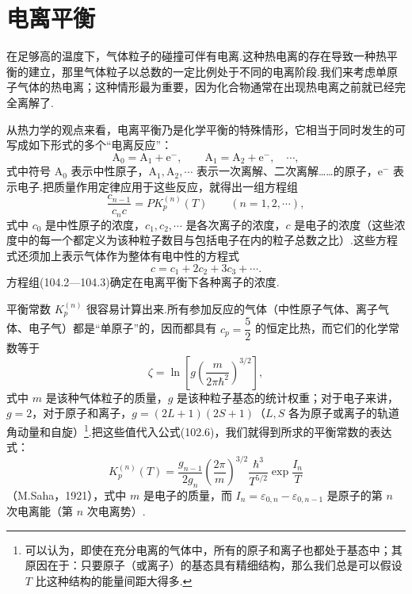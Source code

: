 \section{电离平衡}

在足够高的温度下，气体粒子的碰撞可伴有电离.这种热电离的存在导致一种热平衡的建立，那里气体粒子以总数的一定比例处于不同的电离阶段.我们来考虑单原子气体的热电离；这种情形最为重要，因为化合物通常在出现热电离之前就已经完全离解了.

从热力学的观点来看，电离平衡乃是化学平衡的特殊情形，它相当于同时发生的可写成如下形式的多个“电离反应”：
\begin{equation}
  \mathrm{A}_0=\mathrm{A}_1+\mathrm{e}^-,\qquad
  \mathrm{A}_1=\mathrm{A}_2+\mathrm{e}^-,\quad\cdots,
\end{equation}
式中符号 $\mathrm{A}_0$ 表示中性原子，$\mathrm{A}_1,\mathrm{A}_2,\cdots$ 表示一次离解、二次离解……的原子，$\mathrm{e}^-$ 表示电子.把质量作用定律应用于这些反应，就得出一组方程组
\begin{equation}
  \frac{c_{n-1}}{c_nc}=PK_p^{(n)}(T)\qquad(n=1,2,\cdots),
\end{equation}
式中 $c_0$ 是中性原子的浓度，$c_1,c_2,\cdots$ 是各次离子的浓度，$c$ 是电子的浓度（这些浓度中的每一个都定义为该种粒子数目与包括电子在内的粒子总数之比）.这些方程式还须加上表示气体作为整体有电中性的方程式
\begin{equation}
  c=c_1+2c_2+3c_3+\cdots.
\end{equation}
方程组(104.2—104.3)确定在电离平衡下各种离子的浓度.

平衡常数 $K_p^{(n)}$ 很容易计算出来.所有参加反应的气体（中性原子气体、离子气体、电子气）都是“单原子”的，因而都具有 $c_p=\dfrac52$ 的恒定比热，而它们的化学常数等于
\begin{equation*}
  \zeta=\ln\left[g\left(\frac{m}{2\pi\hbar^2}\right)^{3/2}\right],
\end{equation*}
式中 $m$ 是该种气体粒子的质量，$g$ 是该种粒子基态的统计权重；对于电子来讲，$g=2$，对于原子和离子，$g=(2L+1)(2S+1)$（$L,S$ 各为原子或离子的轨道角动量和自旋）\footnote{可以认为，即使在充分电离的气体中，所有的原子和离子也都处于基态中；其原因在于：只要原子（或离子）的基态具有精细结构，那么我们总是可以假设 $T$ 比这种结构的能量间距大得多.}.把这些值代入公式(102.6)，我们就得到所求的平衡常数的表达式：
\begin{equation}
  K_p^{(n)}(T)=\frac{g_{n-1}}{2g_n}
  \left(\frac{2\pi}{m}\right)^{3/2}
  \frac{\hbar^3}{T^{5/2}}\exp\frac{I_n}{T}
\end{equation}
（M.Saha，1921），式中 $m$ 是电子的质量，而 $I_n=\varepsilon_{0,n}-\varepsilon_{0,n-1}$ 是原子的第 $n$ 次电离能（第 $n$ 次电离势）.


